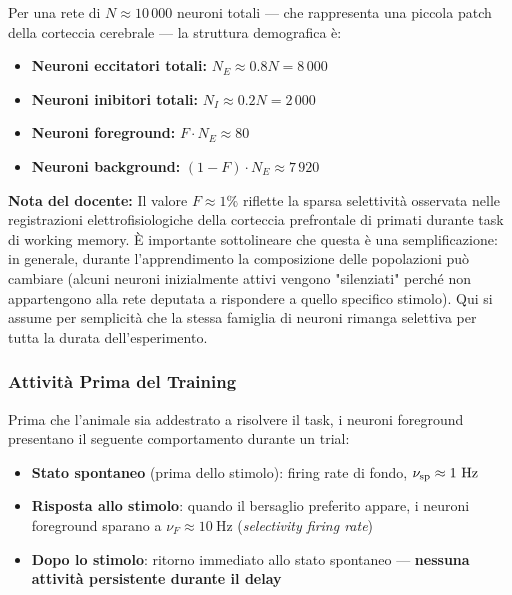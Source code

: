 Per una rete di $N \approx 10\,000$ neuroni totali — che rappresenta una piccola patch della corteccia cerebrale — la struttura demografica è:
\begin{itemize}
    \item \textbf{Neuroni eccitatori totali:} $N_E \approx 0.8 N = 8\,000$
    \item \textbf{Neuroni inibitori totali:} $N_I \approx 0.2 N = 2\,000$
    \item \textbf{Neuroni foreground:} $F \cdot N_E \approx 80$
    \item \textbf{Neuroni background:} $(1-F) \cdot N_E \approx 7\,920$
\end{itemize}

\begin{tcolorbox}[colback=gray!5, colframe=gray!40, arc=2mm, boxrule=0.5pt]
\textbf{Nota del docente:} Il valore $F \approx 1\%$ riflette la sparsa selettività osservata nelle registrazioni elettrofisiologiche della corteccia prefrontale di primati durante task di working memory. È importante sottolineare che questa è una semplificazione: in generale, durante l'apprendimento la composizione delle popolazioni può cambiare (alcuni neuroni inizialmente attivi vengono "silenziati" perché non appartengono alla rete deputata a rispondere a quello specifico stimolo). Qui si assume per semplicità che la stessa famiglia di neuroni rimanga selettiva per tutta la durata dell'esperimento.
\end{tcolorbox}



\subsubsection{Attività Prima del Training}

Prima che l'animale sia addestrato a risolvere il task, i neuroni foreground presentano il seguente comportamento durante un trial:

\begin{itemize}
    \item \textbf{Stato spontaneo} (prima dello stimolo): firing rate di fondo, $\nu_{\rm sp} \approx 1\ \mathrm{Hz}$
    \item \textbf{Risposta allo stimolo}: quando il bersaglio preferito appare, i neuroni foreground sparano a $\nu_F \approx 10\ \mathrm{Hz}$ (\textit{selectivity firing rate})
    \item \textbf{Dopo lo stimolo}: ritorno immediato allo stato spontaneo — \textbf{nessuna attività persistente durante il delay}
\end{itemize}

